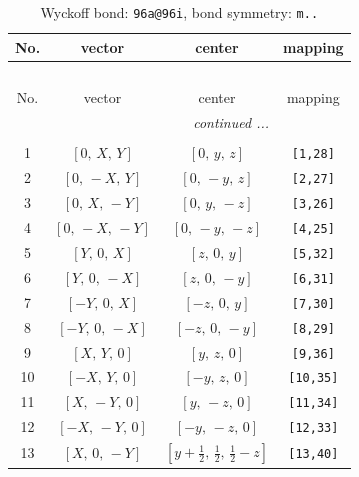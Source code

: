 \documentclass[fleqn,8pt]{jsarticle}
\begin{document}
\begin{longtable}{cccc}
\caption{Wyckoff bond: {\tt 96a@96i}, bond symmetry: {\tt m..}}
 \\
 \hline \hline
No. & vector & center & mapping \\ \hline \endfirsthead

\multicolumn{3}{l}{\tablename\ \thetable{}} \\
 \hline \hline
No. & vector & center & mapping \\ \hline \endhead

 \hline \hline
\multicolumn{3}{r}{\footnotesize\it continued ...} \\ \endfoot

 \hline \hline
\multicolumn{3}{r}{} \\ \endlastfoot

1 & $\left[ 0,\, X,\, Y \right]$ & $\left[ 0,\, y,\, z \right]$ & {\tt [1,28]} \\ \hline
2 & $\left[ 0,\, - X,\, Y \right]$ & $\left[ 0,\, - y,\, z \right]$ & {\tt [2,27]} \\ \hline
3 & $\left[ 0,\, X,\, - Y \right]$ & $\left[ 0,\, y,\, - z \right]$ & {\tt [3,26]} \\ \hline
4 & $\left[ 0,\, - X,\, - Y \right]$ & $\left[ 0,\, - y,\, - z \right]$ & {\tt [4,25]} \\ \hline
5 & $\left[ Y,\, 0,\, X \right]$ & $\left[ z,\, 0,\, y \right]$ & {\tt [5,32]} \\ \hline
6 & $\left[ Y,\, 0,\, - X \right]$ & $\left[ z,\, 0,\, - y \right]$ & {\tt [6,31]} \\ \hline
7 & $\left[ - Y,\, 0,\, X \right]$ & $\left[ - z,\, 0,\, y \right]$ & {\tt [7,30]} \\ \hline
8 & $\left[ - Y,\, 0,\, - X \right]$ & $\left[ - z,\, 0,\, - y \right]$ & {\tt [8,29]} \\ \hline
9 & $\left[ X,\, Y,\, 0 \right]$ & $\left[ y,\, z,\, 0 \right]$ & {\tt [9,36]} \\ \hline
10 & $\left[ - X,\, Y,\, 0 \right]$ & $\left[ - y,\, z,\, 0 \right]$ & {\tt [10,35]} \\ \hline
11 & $\left[ X,\, - Y,\, 0 \right]$ & $\left[ y,\, - z,\, 0 \right]$ & {\tt [11,34]} \\ \hline
12 & $\left[ - X,\, - Y,\, 0 \right]$ & $\left[ - y,\, - z,\, 0 \right]$ & {\tt [12,33]} \\ \hline
13 & $\left[ X,\, 0,\, - Y \right]$ & $\left[ y + \frac{1}{2},\, \frac{1}{2},\, \frac{1}{2} - z \right]$ & {\tt [13,40]} \\ \hline

\end{longtable}
\end{document}

